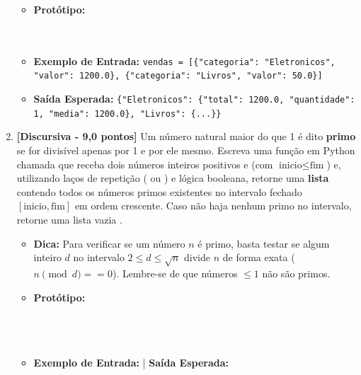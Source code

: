 \begin{enumerate}[label=\textbf{Q\arabic*.}, start=1]
\begin{itemize}[leftmargin=*]
    \item \textbf{Protótipo:}\newline {}\\\\\\
    \item \textbf{Exemplo de Entrada:}\newline
    \texttt{vendas = [\{"categoria": "Eletronicos", "valor": 1200.0\}, \{"categoria": "Livros", "valor": 50.0\}]}
    \item \textbf{Saída Esperada:}\newline
    \texttt{\{"Eletronicos": \{"total": 1200.0, "quantidade": 1, "media": 1200.0\}, "Livros": \{...\}\}}
\end{itemize}



\vspace{0.5cm}

\item \textbf{[Discursiva - 9,0 pontos]} Um número natural maior do que 1 é dito \textbf{primo} se for divisível apenas por 1 e por ele mesmo. Escreva uma função em Python chamada  que receba dois números inteiros positivos  e  (com $\text{inicio} \le \text{fim}$) e, utilizando laços de repetição ( ou ) e lógica booleana, retorne uma \textbf{lista} contendo todos os números primos existentes no intervalo fechado $[\text{inicio}, \text{fim}]$ em ordem crescente. Caso não haja nenhum primo no intervalo, retorne uma lista vazia \code{[]}.

\begin{itemize}[leftmargin=*]
    \item \textbf{Dica:} Para verificar se um número $n$ é primo, basta testar se algum inteiro $d$ no intervalo $2 \le d \le \sqrt{n}$ divide $n$ de forma exata ($n \pmod d == 0$). Lembre-se de que números $\le 1$ não são primos.
    \item \textbf{Protótipo:}\newline {}\\\\\\\\
    \item \textbf{Exemplo de Entrada:}  \quad | \quad \textbf{Saída Esperada:} \code{[11, 13, 17, 19, 23, 29]}
\end{itemize}


\end{enumerate}
